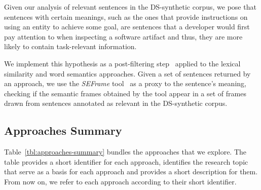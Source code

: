 

Given our analysis of relevant sentences in the \acs{DS-synthetic} corpus, we pose that 
sentences with certain meanings, such as the ones that provide instructions on using an entity to achieve some goal,
are sentences that a developer would first pay attention to when inspecting a software artifact and thus, they are more likely to contain task-relevant information. 



We implement this hypothesis as a post-filtering step~\cite{Manning2009IR} applied to the lexical similarity and word semantics approaches.
Given a set of sentences returned by an approach, 
we use the \textit{SEFrame} tool~\cite{marques2021} as a proxy to the sentence's meaning,
checking if the semantic frames obtained by the tool appear in a set of frames drawn from  sentences annotated as relevant in the \acs{DS-synthetic} corpus.







\subsection{Approaches Summary}


Table~\ref{tbl:approaches-summary} bundles the approaches that we explore.
The table provides a short identifier for each approach, identifies the research topic that serve as a basis for each approach and provides a short description for them. From now on, we refer to each approach according to their short identifier.


